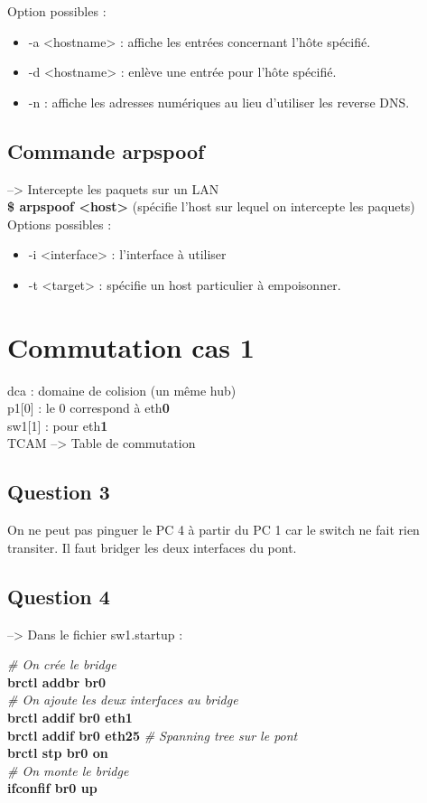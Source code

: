 \documentclass[a4paper]{article}
\begin{document}
Option possibles : 
\begin{itemize}
	\item -a <hostname> : affiche les entrées concernant l’hôte spécifié. 
	\item -d <hostname> : enlève une entrée pour l'hôte spécifié.
	\item -n : affiche les adresses numériques au lieu d'utiliser les reverse DNS. 
\end{itemize}

	\subsection{Commande arpspoof}
\noindent
--> Intercepte les paquets sur un LAN \\
\textbf{\$ arpspoof <host>} (spécifie l'host sur lequel on intercepte les paquets) \\

Options possibles : 
\begin{itemize}
	\item -i <interface> : l'interface à utiliser
	\item -t <target> : spécifie un host particulier à empoisonner.
\end{itemize}

	\section{Commutation cas 1}
\noindent
dca : domaine de colision (un même hub) \\
p1[0] : le 0 correspond à eth\textbf{0} \\
sw1[1] : pour eth\textbf{1} \\
TCAM --> Table de commutation\\

		\subsection{Question 3}
On ne peut pas pinguer le PC 4 à partir du PC 1 car le switch ne fait rien transiter. Il faut bridger les deux interfaces du pont. 

		\subsection{Question 4}
--> Dans le fichier sw1.startup : 

\noindent
\textit{\# On crée le bridge}	\\
\textbf{brctl addbr br0}\\
\textit{\# On ajoute les deux interfaces au bridge}\\
\textbf{brctl addif br0 eth1\\
brctl addif br0 eth25}
\textit{\# Spanning tree sur le pont} \\
\textbf{brctl stp br0 on}\\
\textit{\# On monte le bridge}\\
\textbf{ifconfif br0 up}\\
\end{document}
